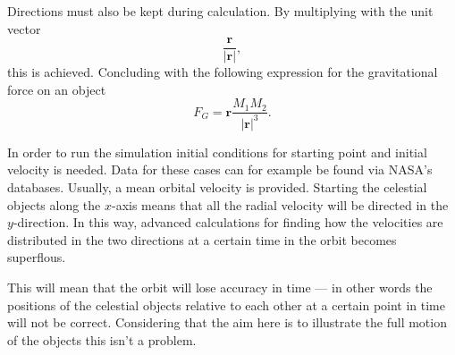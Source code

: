 Directions must also be kept during calculation. By multiplying
with the unit vector \[ \frac{\mathbf{r}}{|\mathbf{r}|}, \] this is
achieved. Concluding with the following expression for the
gravitational force on an object \[ F_G = \mathbf{r}
\frac{M_1 M_2}{|\mathbf{r}|^3}. \]

In order to run the simulation initial conditions for starting
point and initial velocity is needed. Data for these cases can for
example be found via NASA's databases. Usually, a mean orbital
velocity is provided. Starting the celestial objects along the
$x$-axis means that all the radial velocity will be directed in the
$y$-direction. In this way, advanced calculations for finding how
the velocities are distributed in the two directions at a certain
time in the orbit becomes superflous.

This will mean that the orbit will lose accuracy in time --- in
other words the positions of the celestial objects relative to each
other at a certain point in time will not be correct. Considering
that the aim here is to illustrate the full motion of the objects
this isn't a problem.
